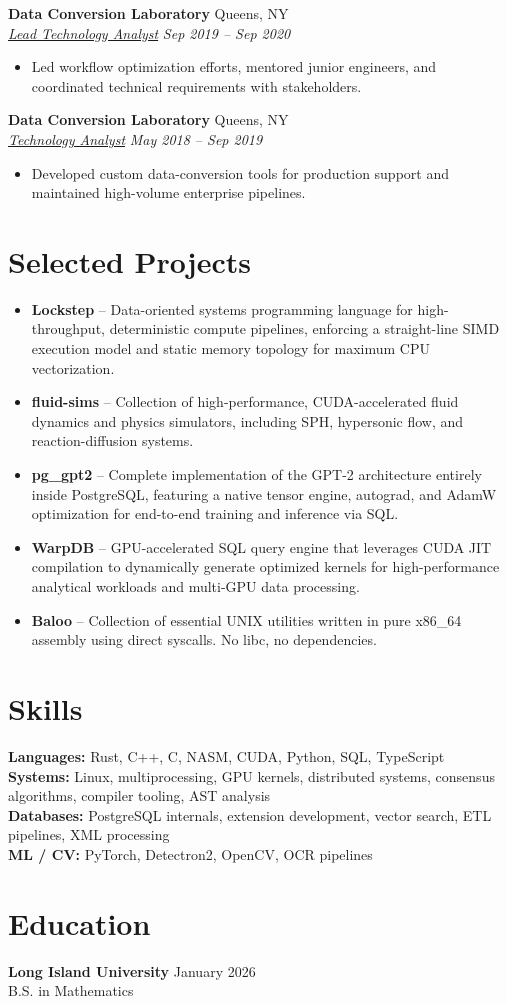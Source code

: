 \documentclass[10pt,letterpaper]{article}
\newcommand{\resumeSubheading}[4]{%
  \textbf{#1} \hfill #2\\
  \underline{\textit{#3}} \hfill \textit{#4}\\
  \vspace{-1em}
}
\begin{document}
\resumeSubheading{Data Conversion Laboratory}{Queens, NY}{Lead Technology Analyst}{Sep 2019 -- Sep 2020}
\begin{itemize}
  \item Led workflow optimization efforts, mentored junior engineers, and coordinated technical requirements with stakeholders.
\end{itemize}

\resumeSubheading{Data Conversion Laboratory}{Queens, NY}{Technology Analyst}{May 2018 -- Sep 2019}
\begin{itemize}
  \item Developed custom data-conversion tools for production support and maintained high-volume enterprise pipelines.
\end{itemize}

\section{Selected Projects}
\begin{itemize}
  \item \textbf{Lockstep} -- Data-oriented systems programming language for high-throughput, deterministic compute pipelines, enforcing a straight-line SIMD execution model and static memory topology for maximum CPU vectorization.
  \item \textbf{fluid-sims} -- Collection of high-performance, CUDA-accelerated fluid dynamics and physics simulators, including SPH, hypersonic flow, and reaction-diffusion systems.
  \item \textbf{pg\_gpt2} -- Complete implementation of the GPT-2 architecture entirely inside PostgreSQL, featuring a native tensor engine, autograd, and AdamW optimization for end-to-end training and inference via SQL.
  \item \textbf{WarpDB} -- GPU-accelerated SQL query engine that leverages CUDA JIT compilation to dynamically generate optimized kernels for high-performance analytical workloads and multi-GPU data processing.
  \item \textbf{Baloo} -- Collection of essential UNIX utilities written in pure x86\_64 assembly using direct syscalls. No libc, no dependencies.
\end{itemize}

\section{Skills}
\textbf{Languages:} Rust, C++, C, NASM, CUDA, Python, SQL, TypeScript\\
\textbf{Systems:} Linux, multiprocessing, GPU kernels, distributed systems, consensus algorithms, compiler tooling, AST analysis\\
\textbf{Databases:} PostgreSQL internals, extension development, vector search, ETL pipelines, XML processing\\
\textbf{ML / CV:} PyTorch, Detectron2, OpenCV, OCR pipelines

\section{Education}
\textbf{Long Island University} \hfill January 2026\\
B.S. in Mathematics
\end{document}
